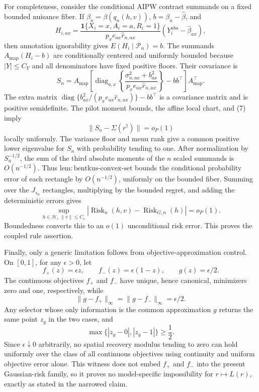 For completeness, consider the conditional AIPW contrast summands on a fixed bounded nuisance fiber.  If \(\beta_n=\beta(q_n(h,v))\), \(b=\beta_n-\widehat\beta\), and
\[
H_{i,ax}=\frac{\mathbf1\{X_i=x,A_i=a,R_i=1\}}
{p_xe_{ax}\widehat r_{n,ax}}
(Y_i^{\mathrm{obs}}-\widehat\beta_{ax}),
\]
then annotation ignorability gives \(E(H_i\mid\mathscr P_n)=b\).  The summands
\(A_{\mathrm{map}}(H_i-b)\) are conditionally centered and uniformly bounded because \(|Y|\le C_Y\) and all denominators have fixed positive floors.  Their covariance is
\[
S_n=A_{\mathrm{map}}\left[
\operatorname{diag}_{a,x}\left\{
\frac{\sigma^2_{n,ax}+b_{ax}^2}
{p_xe_{ax}\widehat r_{n,ax}}
\right\}-bb^\top\right]A_{\mathrm{map}}^\top.
\tag{8}
\]
The extra matrix
\(\operatorname{diag}\{b_{ax}^2/(p_xe_{ax}\widehat r_{n,ax})\}-bb^\top\)
is a covariance matrix and is positive semidefinite.  The pilot moment bounds, the affine local chart, and (7) imply
\[
\lVert S_n-\Sigma(r^\dagger)\rVert=o_P(1)
\tag{9}
\]
locally uniformly.  The variance floor and menu rank give a common positive lower eigenvalue for \(S_n\) with probability tending to one.  After normalization by \(S_n^{-1/2}\), the sum of the third absolute moments of the \(n\) scaled summands is \(O(n^{-1/2})\).  Thus \(\mathrm{lem:bentkus\text{-}convex\text{-}set}\) bounds the conditional probability error of each rectangle by \(O(n^{-1/2})\), uniformly on the bounded fiber.  Summing over the \(J_{s_n}\) rectangles, multiplying by the bounded regret, and adding the deterministic errors gives
\[
\sup_{h\in\mathcal H,\ \lVert v\rVert\le C_v}
|\operatorname{Risk}_{n}(h,v)-\operatorname{Risk}_{G,n}(h)|=o_P(1).
\]
Boundedness converts this to an \(o(1)\) unconditional risk error.  This proves the coupled rule assertion.

Finally, only a generic limitation follows from objective-approximation control.  On \([0,1]\), for any \(\epsilon>0\), let
\[
f_+(z)=\epsilon z,\qquad f_-(z)=\epsilon(1-z),
\qquad g(z)=\epsilon/2.
\]
The continuous objectives \(f_+\) and \(f_-\) have unique, hence canonical, minimizers zero and one, respectively, while
\[
\lVert g-f_+\rVert_\infty
=\lVert g-f_-\rVert_\infty=\epsilon/2.
\]
Any selector whose only information is the common approximation \(g\) returns the same point \(z_g\) in the two cases, and
\[
\max\{|z_g-0|,|z_g-1|\}\ge\frac12.
\]
Since \(\epsilon\downarrow0\) arbitrarily, no spatial recovery modulus tending to zero can hold uniformly over the class of all continuous objectives using continuity and uniform objective error alone.  This witness does not embed \(f_+\) and \(f_-\) into the present Gaussian-risk family, so it proves no model-specific impossibility for \(r\mapsto L(r)\), exactly as stated in the narrowed claim.
